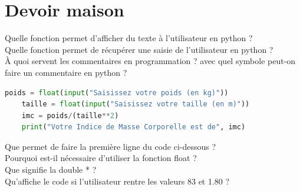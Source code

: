 \section*{Devoir maison}

\begin{Exercise}[title={}]
\Question Quelle fonction permet d'afficher du texte à l'utilisateur en python ?\\

\Question Quelle fonction permet de récupérer une saisie de l'utilisateur en python ?\\

\Question À quoi servent les commentaires en programmation ? avec quel symbole peut-on faire un commentaire en python ? \\

\begin{lstlisting}[style=pythonstyle, language=python]
    poids = float(input("Saisissez votre poids (en kg)"))
    taille = float(input("Saisissez votre taille (en m)"))
    imc = poids/(taille**2)
    print("Votre Indice de Masse Corporelle est de", imc)
\end{lstlisting}

\Question Que permet de faire la première ligne du code ci-dessous ? \\

\Question Pourquoi est-il nécessaire d'utiliser la fonction float ? \\

\Question Que signifie la double * ? \\

\Question Qu'affiche le code si l'utilisateur rentre les valeurs 83 et 1.80 ? \\


\end{Exercise}